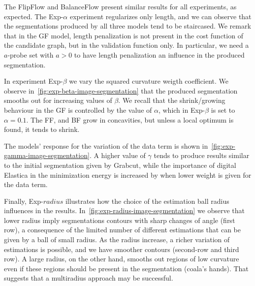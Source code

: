 The FlipFlow and BalanceFlow present similar results for all experiments, as expected. The Exp-$\alpha$ experiment regularizes only length, and we can observe that the segmentations produced by all three models tend to be staircased. We remark that in the GF model, length penalization is not present in the cost function of the candidate graph, but in the validation function only. In particular, we need  a $a$-probe set with $a>0$ to have length penalization an influence in the produced segmentation.

In experiment Exp-$\beta$ we vary the squared curvature weigth coefficient. We observe in~\cref{fig:exp-beta-image-segmentation} that the produced segmentation smooths out for increasing values of $\beta$. We recall that the shrink/growing behaviour in the GF is controlled by the value of $\alpha$, which in Exp-$\beta$ is set to $\alpha=0.1$. The FF, and BF grow in concavities, but unless a local optimum is found, it tends to shrink.

The models' response for the variation of the data term is shown in~\cref{fig:exp-gamma-image-segmentation}. A higher value of $\gamma$ tends to produce results similar to the initial segmentation given by Grabcut, while the importance of digital Elastica in the minimization energy is increased by when lower weight is given for the data term.

Finally, Exp-$radius$ illustrates how the choice of the estimation ball radius influences in the results. In~\cref{fig:exp-radius-image-segmentation} we observe that lower radius imply segmentations contours with sharp changes of angle (first row), a consequence of the limited number of different estimations that can be given by a ball of small radius. As the radius increase, a richer variation of estimations is possible, and we have smoother contours (second-row and third row). A large radius, on the other hand, smooths out regions of low curvature even if these regions should be present in the segmentation (coala's hands). That suggests that a multiradius approach may be successful.


